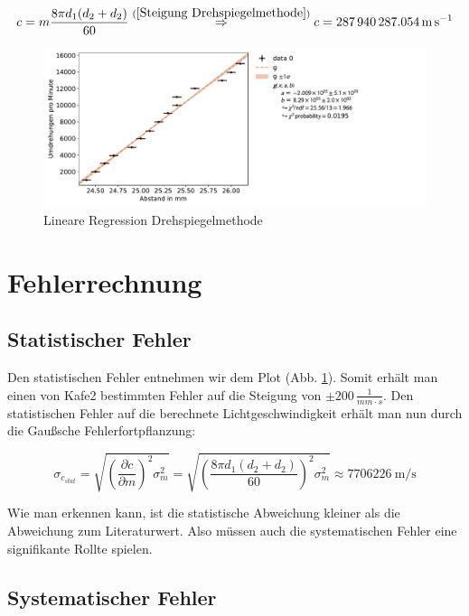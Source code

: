 \begin{equation}
    c = m \frac{8 \pi d_1 (d_2+d_2)}{60}  \stackrel{(\ref{Steigung Drehspiegelmethode})}{\Rightarrow} c = \SI{287940287.054}{\metre\per\second}
\end{equation}

\begin{figure}[ht]
    \centering
    \includegraphics[scale=0.45]{Lichtgeschwindigkeit/Protokoll/fig/Drehspiegelmethode.pdf}
    \caption{Lineare Regression Drehspiegelmethode}
    \label{fig:Drehspiegelmethode Anpassung}
\end{figure}

\section{Fehlerrechnung}

\subsection{Statistischer Fehler}

Den statistischen Fehler entnehmen wir dem Plot (Abb. \ref{fig:Drehspiegelmethode Anpassung}). Somit erhält man einen von Kafe2 bestimmten Fehler auf die Steigung von $\pm 200 \, \frac{1}{mm \cdot s}$. Den statistischen Fehler auf die berechnete Lichtgeschwindigkeit erhält man nun durch die Gaußsche Fehlerfortpflanzung:

\begin{equation}
    \sigma_{c_{stat}} = \sqrt{(\frac{\partial c }{\partial m})^2 \sigma_m^2} = \sqrt{( \frac{8 \pi d_1 (d_2+d_2)}{60})^2 \sigma_m^2} \approx \SI{7706226}{\metre\per\second}
\end{equation}

Wie man erkennen kann, ist die statistische Abweichung kleiner als die Abweichung zum Literaturwert. Also müssen auch die systematischen Fehler eine signifikante Rollte spielen. 

\subsection{Systematischer Fehler}

